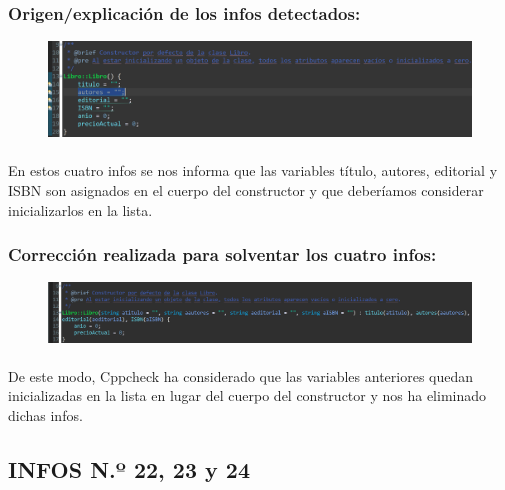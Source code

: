 		\subsubsection{Origen/explicación de los infos detectados:}
		
			\begin{figure}[H]
				\centering
				\includegraphics[scale=0.55]{img/esteban26.png}
				\label{esteban26}
			\end{figure}
		
			\paragraph{}En estos cuatro infos se nos informa que las variables título, autores, editorial y ISBN son asignados en el cuerpo del constructor y que deberíamos considerar inicializarlos en la lista.
			
		\subsubsection{Corrección realizada para solventar los cuatro infos:}
		
			\begin{figure}[H]
				\centering
				\includegraphics[scale=0.55]{img/esteban27.png}
				\label{esteban27}
			\end{figure}
		
			\paragraph{}De este modo, Cppcheck ha considerado que las variables anteriores quedan inicializadas en la lista en lugar del cuerpo del constructor y nos ha eliminado dichas infos.
			
	\subsection{INFOS N.º 22, 23 y 24}
	
